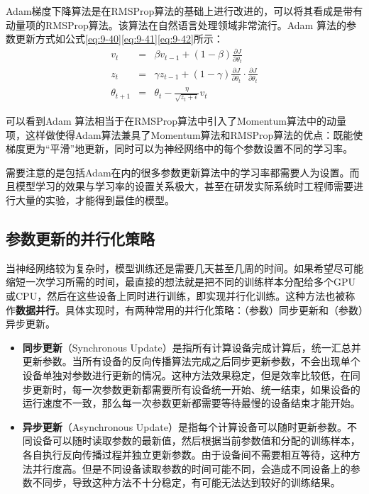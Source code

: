 \parinterval  Adam梯度下降算法是在RMSProp算法的基础上进行改进的，可以将其看成是带有动量项的RMSProp算法。该算法在自然语言处理领域非常流行。Adam 算法的参数更新方式如公式\eqref{eq:9-40}\eqref{eq:9-41}\eqref{eq:9-42}所示：
\begin{eqnarray}
v_t&=&\beta v_{t-1}+(1-\beta)\frac{\partial J}{\partial {\theta}_t}
\label{eq:9-40}\\
z_t&=&\gamma z_{t-1}+(1-\gamma) \frac{\partial J}{\partial {\theta}_t} \cdot  \frac{\partial J}{\partial {\theta}_t}
\label{eq:9-41}\\
{\theta}_{t+1}&=&{\theta}_t-\frac{\eta}{\sqrt{z_t+\epsilon}} v_t
\label{eq:9-42}
\end{eqnarray}

\noindent 可以看到Adam 算法相当于在RMSProp算法中引入了Momentum算法中的动量项，这样做使得Adam算法兼具了Momentum算法和RMSProp算法的优点：既能使梯度更为“平滑”地更新，同时可以为神经网络中的每个参数设置不同的学习率。

\parinterval  需要注意的是包括Adam在内的很多参数更新算法中的学习率都需要人为设置。而且模型学习的效果与学习率的设置关系极大，甚至在研发实际系统时工程师需要进行大量的实验，才能得到最佳的模型。


\subsection{参数更新的并行化策略}

\parinterval  当神经网络较为复杂时，模型训练还是需要几天甚至几周的时间。如果希望尽可能缩短一次学习所需的时间，最直接的想法就是把不同的训练样本分配给多个GPU 或CPU，然后在这些设备上同时进行训练，即实现并行化训练。这种方法也被称作{\small\sffamily\bfseries{数据并行}}。具体实现时，有两种常用的并行化策略：（参数）同步更新和（参数）异步更新。

\begin{itemize}
\vspace{0.5em}
\item {\small\sffamily\bfseries{同步更新}}（Synchronous Update）是指所有计算设备完成计算后，统一汇总并更新参数。当所有设备的反向传播算法完成之后同步更新参数，不会出现单个设备单独对参数进行更新的情况。这种方法效果稳定，但是效率比较低，在同步更新时，每一次参数更新都需要所有设备统一开始、统一结束，如果设备的运行速度不一致，那么每一次参数更新都需要等待最慢的设备结束才能开始。
\vspace{0.5em}
\item {\small\sffamily\bfseries{异步更新}}（Asynchronous Update）是指每个计算设备可以随时更新参数。不同设备可以随时读取参数的最新值，然后根据当前参数值和分配的训练样本，各自执行反向传播过程并独立更新参数。由于设备间不需要相互等待，这种方法并行度高。但是不同设备读取参数的时间可能不同，会造成不同设备上的参数不同步，导致这种方法不十分稳定，有可能无法达到较好的训练结果。
\vspace{0.5em}
\end{itemize}

